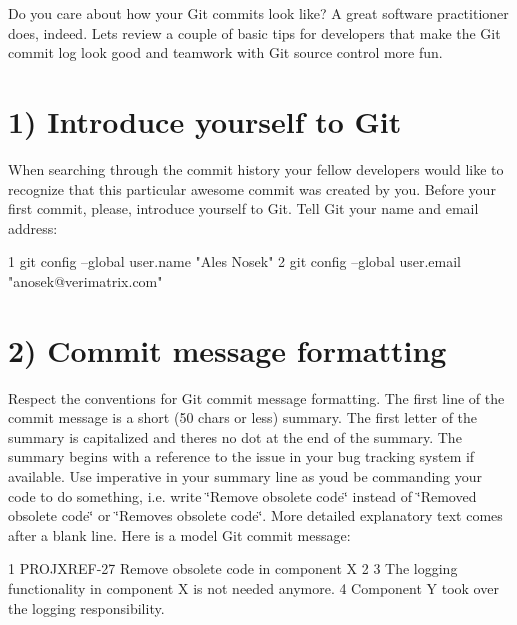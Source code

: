 Do you care about how your Git commits look like? A great software practitioner does, indeed. Let\textquotesingle{}s review a couple of basic tips for developers that make the Git commit log look good and teamwork with Git source control more fun.\hypertarget{git_tips_git_tips_introduce}{}\section{1) Introduce yourself to Git}\label{git_tips_git_tips_introduce}
When searching through the commit history your fellow developers would like to recognize that this particular awesome commit was created by you. Before your first commit, please, introduce yourself to Git. Tell Git your name and email address\+: 
\begin{DoxyCode}
1 git config --global user.name "Ales Nosek"
2 git config --global user.email "anosek@verimatrix.com"
\end{DoxyCode}
\hypertarget{git_tips_git_tips_commit}{}\section{2) Commit message formatting}\label{git_tips_git_tips_commit}
Respect the conventions for Git commit message formatting. The first line of the commit message is a short (50 chars or less) summary. The first letter of the summary is capitalized and there\textquotesingle{}s no dot at the end of the summary. The summary begins with a reference to the issue in your bug tracking system if available. Use imperative in your summary line as you\textquotesingle{}d be commanding your code to do something, i.\+e. write \char`\"{}\+Remove obsolete code\char`\"{} instead of \char`\"{}\+Removed obsolete code\char`\"{} or \char`\"{}\+Removes obsolete code\char`\"{}. More detailed explanatory text comes after a blank line. Here is a model Git commit message\+:


\begin{DoxyCode}
1 PROJXREF-27 Remove obsolete code in component X
2 
3 The logging functionality in component X is not needed anymore.
4 Component Y took over the logging responsibility.
\end{DoxyCode}


